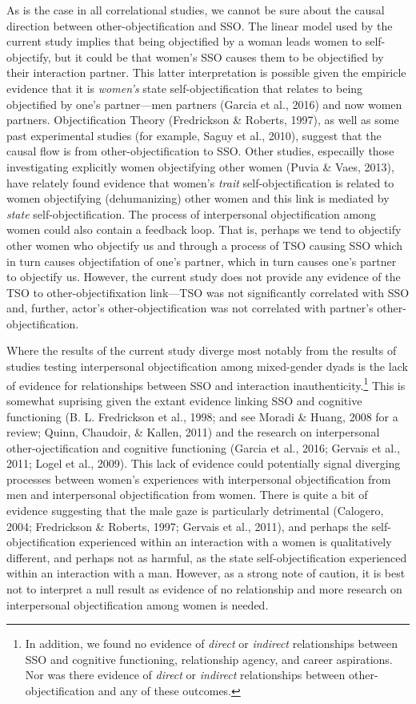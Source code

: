 \documentclass[man]{apa6}
\let\rmarkdownfootnote\footnote%
\def\footnote{\protect\rmarkdownfootnote}
\begin{document}
As is the case in all correlational studies, we cannot be sure about the
causal direction between other-objectification and SSO. The linear model
used by the current study implies that being objectified by a woman
leads women to self-objectify, but it could be that women's SSO causes
them to be objectified by their interaction partner. This latter
interpretation is possible given the empiricle evidence that it is
\emph{women's} state self-objectification that relates to being
objectified by one's partner---men partners (Garcia et al., 2016) and
now women partners. Objectification Theory (Fredrickson \& Roberts,
1997), as well as some past experimental studies (for example, Saguy et
al., 2010), suggest that the causal flow is from other-objectification
to SSO. Other studies, especailly those investigating explicitly women
objectifying other women (Puvia \& Vaes, 2013), have relately found
evidence that women's \emph{trait} self-objectification is related to
women objectifying (dehumanizing) other women and this link is mediated
by \emph{state} self-objectification. The process of interpersonal
objectification among women could also contain a feedback loop. That is,
perhaps we tend to objectify other women who objectify us and through a
process of TSO causing SSO which in turn causes objectifation of one's
partner, which in turn causes one's partner to objectify us. However,
the current study does not provide any evidence of the TSO to
other-objectifixation link---TSO was not significantly correlated with
SSO and, further, actor's other-objectification was not correlated with
partner's other-objectification.

Where the results of the current study diverge most notably from the
results of studies testing interpersonal objectification among
mixed-gender dyads is the lack of evidence for relationships between SSO
and interaction inauthenticity.\footnote{In addition, we found no
  evidence of \emph{direct} or \emph{indirect} relationships between SSO
  and cognitive functioning, relationship agency, and career
  aspirations. Nor was there evidence of \emph{direct} or
  \emph{indirect} relationships between other-objectification and any of
  these outcomes.} This is somewhat suprising given the extant evidence
linking SSO and cognitive functioning (B. L. Fredrickson et al., 1998;
and see Moradi \& Huang, 2008 for a review; Quinn, Chaudoir, \& Kallen,
2011) and the research on interpersonal other-ojectification and
cognitive functioning (Garcia et al., 2016; Gervais et al., 2011; Logel
et al., 2009). This lack of evidence could potentially signal diverging
processes between women's experiences with interpersonal objectification
from men and interpersonal objectification from women. There is quite a
bit of evidence suggesting that the male gaze is particularly
detrimental (Calogero, 2004; Fredrickson \& Roberts, 1997; Gervais et
al., 2011), and perhaps the self-objectification experienced within an
interaction with a women is qualitatively different, and perhaps not as
harmful, as the state self-objectification experienced within an
interaction with a man. However, as a strong note of caution, it is best
not to interpret a null result as evidence of no relationship and more
research on interpersonal objectification among women is needed.
\end{document}
